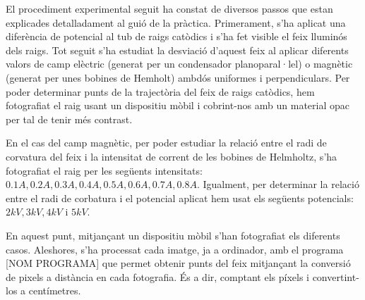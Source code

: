 \documentclass[11pt]{article}
\numberwithin{equation}{section}
\numberwithin{figure}{section}
\numberwithin{table}{section}
\begin{document}
El procediment experimental seguit ha constat de diversos passos que estan explicades detalladament al guió de la pràctica. 
Primerament, s'ha aplicat una diferència de potencial al tub de raigs catòdics i s'ha fet visible el feix lluminós dels raigs. Tot seguit s'ha estudiat la desviació d'aquest feix al aplicar diferents valors de camp elèctric (generat per un condensador planoparal·lel) o magnètic (generat per unes bobines de Hemholt) ambdós uniformes i perpendiculars. Per poder determinar punts de la trajectòria del feix de raigs catòdics, hem fotografiat el raig usant un dispositiu mòbil i cobrint-nos amb un material opac per tal de tenir més contrast.

En el cas del camp magnètic, per poder estudiar la relació entre el radi de corvatura del feix i la intensitat de corrent de les bobines de Helmholtz, s'ha fotografiat el raig per les següents intensitats:  $0.1A, 0.2A, 0.3A, 0.4A, 0.5A, 0.6A, 0.7A, 0.8A$. Igualment, per determinar la relació entre el radi de corbatura i el potencial aplicat hem usat els següents potencials: $2kV, 3kV, 4kV$ i $5kV$.

En aquest punt, mitjançant un dispositiu mòbil s'han fotografiat els diferents casos. Aleshores, s'ha processat cada imatge, ja a ordinador, amb el programa [NOM PROGRAMA] que permet obtenir punts del feix mitjançant la conversió de pixels a distància en cada fotografia. És a dir, comptant els píxels i convertint-los a centímetres. 



\end{document}
